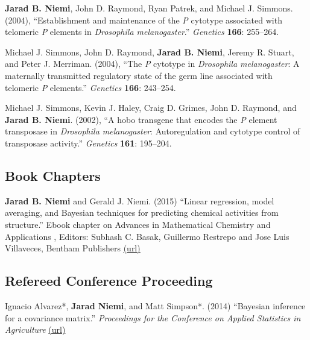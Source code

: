 \documentclass[overlapped,line]{res}
\begin{document}
\begin{resume}
{\bf Jarad B. Niemi}, John D. Raymond, Ryan Patrek, and Michael J. Simmons. (2004), ``Establishment and maintenance of the \emph{P} cytotype associated with telomeric \emph{P} elements in \emph{Drosophila melanogaster}.'' \emph{Genetics} {\bf 166}: 255--264.

Michael J. Simmons, John D. Raymond, {\bf Jarad B. Niemi}, Jeremy R. Stuart, and Peter J. Merriman. (2004), ``The \emph{P} cytotype in \emph{Drosophila melanogaster}: A maternally transmitted regulatory state of the germ line associated with telomeric \emph{P} elements.'' \emph{Genetics} {\bf 166}: 243--254.


Michael J. Simmons, Kevin J. Haley, Craig D. Grimes, John D. Raymond, and {\bf Jarad B. Niemi}. (2002), ``A hobo transgene that encodes the \emph{P} element transposase in \emph{Drosophila melanogaster}: Autoregulation and cytotype control of transposase activity.'' \emph{Genetics} {\bf 161}: 195--204.





\subsection{\bf Book Chapters}

{\bf Jarad B. Niemi} and Gerald J. Niemi. (2015) ``Linear regression, model averaging, and Bayesian techniques for predicting chemical activities from structure.'' Ebook chapter on Advances in Mathematical Chemistry and Applications
, Editors: Subhash C. Basak, Guillermo Restrepo and Jose Luis Villaveces, Bentham Publishers \href{http://www.eurekaselect.com/132675/chapter/linear-regression%2C-model-averaging%2C-and-bayesian-techniques-for-predicting-chemical-activities-from-structur}{(url)}


\subsection{\bf Refereed Conference Proceeding}

Ignacio Alvarez*, {\bf Jarad Niemi}, and Matt Simpson*. (2014) ``Bayesian inference for a covariance matrix.'' \emph{Proceedings for the Conference on Applied Statistics in Agriculture} \href{http://newprairiepress.org/agstatconference/2014/proceedings/8/}{(url)}


\end{resume}
\end{document}
